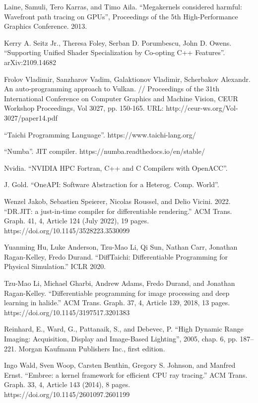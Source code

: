 \documentclass[11pt,fleqn,english,russian]{report} %
\begin{document}
\begin{thebibliography}{10}
	 Laine, Samuli, Tero Karras, and Timo Aila. ``Megakernels considered harmful: Wavefront path tracing on GPUs'', Proceedings of the 5th High-Performance Graphics Conference. 2013.
	
	 Kerry A. Seitz Jr., Theresa Foley, Serban D. Porumbescu, John D. Owens. ``Supporting Unified Shader Specialization by Co-opting C++ Features''. arXiv:2109.14682 
	
	 Frolov Vladimir, Sanzharov Vadim, Galaktionov Vladimir, Scherbakov Alexandr. An auto-programming approach to Vulkan. // Proceedings of the 31th International Conference on Computer Graphics and Machine Vision, CEUR Workshop Proceedings, Vol 3027, pp. 150-165. URL: http://ceur-ws.org/Vol-3027/paper14.pdf 
	
	 ``Taichi Programming Language''. https://www.taichi-lang.org/
	
	 ``Numba''. JIT compiler. https://numba.readthedocs.io/en/stable/
	
	 Nvidia. ``NVIDIA HPC Fortran, C++ and C Compilers with OpenACC''.
	
	 J. Gold. ``OneAPI: Software Abstraction for a Heterog. Comp. World''. 
	
	 Wenzel Jakob, Sebastien Speierer, Nicolas Roussel, and Delio Vicini. 2022. ``DR.JIT: a just-in-time compiler for differentiable rendering.'' ACM Trans. Graph. 41, 4, Article 124 (July 2022), 19 pages. https://doi.org/10.1145/3528223.3530099
	
	 Yuanming Hu, Luke Anderson, Tzu-Mao Li, Qi Sun, Nathan Carr, Jonathan Ragan-Kelley, Fredo Durand. ``DiffTaichi: Differentiable Programming for Physical Simulation.'' ICLR 2020.
	
	 Tzu-Mao Li, Michael Gharbi, Andrew Adams, Fredo Durand, and Jonathan Ragan-Kelley. ``Differentiable programming for image processing and deep learning in halide.'' ACM Trans. Graph. 37, 4, Article 139, 2018, 13 pages. https://doi.org/10.1145/3197517.3201383
	
	 Reinhard, E., Ward, G., Pattanaik, S., and Debevec, P. ``High Dynamic Range Imaging: Acquisition, Display and Image-Based Lighting'', 2005, chap. 6, pp. 187–221. Morgan Kaufmann Publishers Inc., first edition.
	
	 Ingo Wald, Sven Woop, Carsten Benthin, Gregory S. Johnson, and Manfred Ernst. ``Embree: a kernel framework for efficient CPU ray tracing.'' ACM Trans. Graph. 33, 4, Article 143 (2014), 8 pages. https://doi.org/10.1145/2601097.2601199
	

\end{thebibliography}
\end{document}
